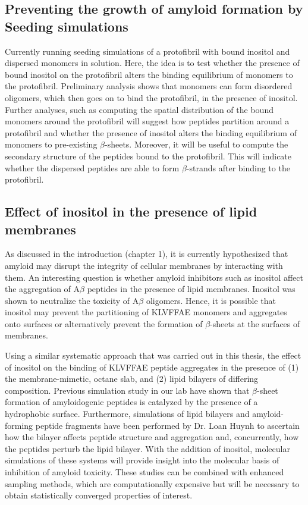 \subsection{Preventing the growth of amyloid formation by Seeding simulations}
Currently running seeding simulations of a protofibril with bound inositol and dispersed monomers in solution. Here, the idea is to test whether the presence of bound inositol on the protofibril alters the binding equilibrium of monomers to the protofibril. Preliminary analysis shows that monomers can form disordered oligomers, which then goes on to bind the protofibril, in the presence of inositol.  Further analyses, such as computing the spatial distribution of the bound monomers around the protofibril will suggest how peptides partition around a protofibril and whether the presence of inositol alters the binding equilibrium of monomers to pre-existing $\beta$-sheets. Moreover, it will be useful to compute the secondary structure of the peptides bound to the protofibril.  This will indicate whether the dispersed peptides are able to form $\beta$-strands after binding to the protofibril.

\subsection{Effect of inositol in the presence of lipid membranes}
As discussed in the introduction (chapter 1), it is currently hypothesized that amyloid may disrupt the integrity of cellular membranes by interacting with them. An interesting question is whether amyloid inhibitors such as inositol affect the aggregation of A$\beta$ peptides in the presence of lipid membranes. Inositol was shown to neutralize the toxicity of A$\beta$ oligomers.\cite{McLaurin:2000bq}  Hence, it is possible that inositol may prevent the partitioning of KLVFFAE monomers and aggregates onto surfaces or alternatively prevent the formation of $\beta$-sheets at the surfaces of membranes.\cite{references}

Using a similar systematic approach that was carried out in this thesis, the effect of inositol on the binding of KLVFFAE peptide aggregates in the presence of (1) the membrane-mimetic, octane slab, and (2) lipid bilayers of differing composition. Previous simulation study in our lab have shown that $\beta$-sheet formation of amyloidogenic peptides is catalyzed by the presence of a hydrophobic surface.\cite{Nikolic:2010go} Furthermore, simulations of lipid bilayers and amyloid-forming peptide fragments have been performed by Dr. Loan Huynh to ascertain how the bilayer affects peptide structure and aggregation and, concurrently, how the peptides perturb the lipid bilayer. With the addition of inositol, molecular simulations of these systems will provide insight into the  molecular basis of inhibition of amyloid toxicity. These studies can be combined with enhanced sampling methods,\cite{TVREX, STDR} which are computationally expensive but will be necessary to obtain statistically converged properties of interest.


